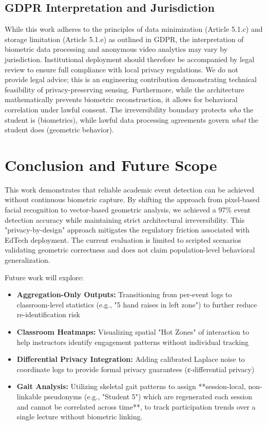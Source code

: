 \documentclass[conference]{IEEEtran}
\begin{document}
\subsection{GDPR Interpretation and Jurisdiction}
While this work adheres to the principles of data minimization (Article 5.1.c) and storage limitation (Article 5.1.e) as outlined in GDPR, the interpretation of biometric data processing and anonymous video analytics may vary by jurisdiction. Institutional deployment should therefore be accompanied by legal review to ensure full compliance with local privacy regulations. We do not provide legal advice; this is an engineering contribution demonstrating technical feasibility of privacy-preserving sensing. Furthermore, while the architecture mathematically prevents biometric reconstruction, it allows for behavioral correlation under lawful consent. The irreversibility boundary protects \textit{who} the student is (biometrics), while lawful data processing agreements govern \textit{what} the student does (geometric behavior).

\section{Conclusion and Future Scope}
This work demonstrates that reliable academic event detection can be achieved without continuous biometric capture. By shifting the approach from pixel-based facial recognition to vector-based geometric analysis, we achieved a 97\% event detection accuracy while maintaining strict architectural irreversibility. This "privacy-by-design" approach mitigates the regulatory friction associated with EdTech deployment. The current evaluation is limited to scripted scenarios validating geometric correctness and does not claim population-level behavioral generalization.

Future work will explore:
\begin{itemize}
    \item \textbf{Aggregation-Only Outputs:} Transitioning from per-event logs to classroom-level statistics (e.g., "5 hand raises in left zone") to further reduce re-identification risk
    \item \textbf{Classroom Heatmaps:} Visualizing spatial "Hot Zones" of interaction to help instructors identify engagement patterns without individual tracking
    \item \textbf{Differential Privacy Integration:} Adding calibrated Laplace noise to coordinate logs to provide formal privacy guarantees (ε-differential privacy)
    \item \textbf{Gait Analysis:} Utilizing skeletal gait patterns to assign **session-local, non-linkable pseudonyms (e.g., "Student 5") which are regenerated each session and cannot be correlated across time**, to track participation trends over a single lecture without biometric linking.
\end{itemize}
\end{document}
